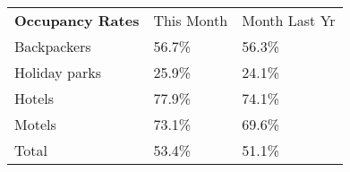 \begin{tabular}[t]{p{4.8cm}>{\hfill}p{1.3cm}>{\hfill}p{1.4cm}}
 \textbf{Occupancy Rates} & This Month & Month Last Yr \\ 
 Backpackers & 56.7\% & 56.3\% \\ 
  Holiday parks & 25.9\% & 24.1\% \\ 
  Hotels & 77.9\% & 74.1\% \\ 
  Motels & 73.1\% & 69.6\% \\ 
  Total & 53.4\% & 51.1\% \\ 
  \end{tabular}
